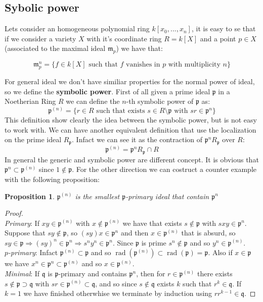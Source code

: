 \documentclass[]{article}
\theoremstyle{plain}
\newtheorem{prop}[teo]{Proposition}
\theoremstyle{remark}
\theoremstyle{definition}
\newcommand{\p}{\mathfrak{p}}
\newcommand{\q}{\mathfrak{q}}
\newcommand{\mm}{\mathfrak{m}}
\DeclareMathOperator{\rad}{rad}
\begin{document}
\subsection{Sybolic power}

	Lets consider an homogeneous polynomial ring $ k[x_0 , ... , x_n] $, it is easy to se that if we consider a variety $ X $ with it's coordinate ring $ R = k[X] $ and a point $ p \in X $ (associated to the maximal ideal $ \mm_p $)  we have that:
	
	\begin{equation}\label{eq:max_pow}
		\mm_p^n = \{ f \in k[X] \text{ such that } f \text{ vanishes in } p \text{ with multiplicity } n\}
	\end{equation}
	
	For general ideal we don't have similiar properties for the normal power of ideal, so we define the \textbf{symbolic power}. %
	First of all given a prime ideal $ \p $ in a Noetherian Ring $ R $ we can define the $ n $-th symbolic power of $ \p $ as:
	\begin{equation}\label{eq:sym_pow_p1}
		\p^{(n)} = \{ r \in R \text{ such that exists } s \in R \setminus \p \text{ with } sr \in \p^n \}
	\end{equation}
	This definition show clearly the idea between the symbolic power, but is not easy to work with. We can have another equivalent definition that use the localization on the prime ideal $ R_\p $. Infact we can see it as the contraction of $ \p^n R_\p $ over $ R $:
	\begin{equation}\label{eq:sym_pow_p2}
		\p^{(n)} = \p^n R_\p \cap R
	\end{equation}
	In general the generic and symbolic power are different concept. It is obvious that $ \p^{n} \subset \p^{(n)} $ since $ 1 \not \in \p $. For the other direction we can costruct a counter example with the following proposition:
	\begin{prop}\label{prop:sym_is_primary}
		$ \p^{(n)} $ is the smallest $ \p $-primary ideal that contain $ \p^n $
	\end{prop}
	\begin{proof}\quad \\
		\textit{Primary}: If $ xy \in  \p^{(n)}$ with $ x \not \in  \p^{(n)}$ we have that exists $ s \not \in \p $ with $ sxy \in \p^n $. Suppose that $ sy \not \in \p $, so $ (sy)x \in \p^n $ and then $ x \in \p^{(n)} $ that is absurd, so $ sy \in \p \Rightarrow (sy)^n \in \p^n \Rightarrow s^n y^n \in \p^n$. Since $ \p $ is prime $ s^n \not \in \p $ and so $ y^n \in \p^{(n)} $. \\
		\textit{$p$-primary}: Infact $ \p^{(n)} \subset \p $ and so $  \rad  (\p^{(n)} )\subset \rad (\p) = \p$. Also if $ x \in \p $ we have $ x^n \in \p^n \subset \p^{(n)}  $ and so $ x \in \p^{(n)}  $.\\
		\textit{Minimal}: If $ \q $ is $ \p $-primary and contains $ \p^n $, then for $ r \in \p^{(n)}  $ there exists $ s \not \in \p \supset \q $ with $ sr \in \p^{(n)}  \subset \q $, and so since $ s \not \in \q  $ exists $ k $ such that $ r^k \in \q $. If $ k=1 $ we have finished otherwhise we terminate by induction using $ r r^{k-1} \in \q $.
	\end{proof}
\end{document}
